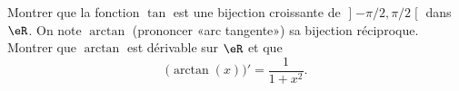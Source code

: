 
\begin{exercice}\label{exoTD4-0002}
  
Montrer que la fonction $\tan$ est une bijection croissante de $\mathopen] -\pi/2 , \pi/2 \mathclose[$ dans $\eR$. On note $\arctan$ (prononcer «arc tangente») sa bijection réciproque. Montrer que $\arctan$ est dérivable sur $\eR$ et que
      \begin{equation}
	\big( \arctan(x) \big)'=\frac{1}{ 1+x^2 }.
      \end{equation}


\end{exercice}
